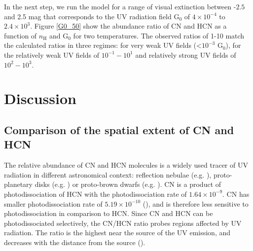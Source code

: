 \documentclass{aa}
\begin{document}
In the next step, we run the model for a
range of visual extinction between -$2.5$ and 2.5 mag that corresponds to
the UV radiation field G$_0$ of $4\times 10^{-4}$ to $2.4\times 10^{3}$. 
Figure \ref{G0_50} show the abundance ratio of CN and HCN as a function of
$n_\mathrm{H}$ and G$_0$ for two temperatures. The observed ratios 
of 1-10 match the calculated ratios in three regimes: for very weak UV fields (<$10^{-3}$ G$_0$),
for the relatively weak UV fields of $10^{-1}-10^1$ and relatively strong UV fields of $10^{2}-10^3$.

%
\section{Discussion}
\label{section:discussion}

\subsection{Comparison of the spatial extent of CN and HCN}
\label{subsection:extent}

The relative abundance of CN and HCN molecules is a widely used tracer of UV radiation in different
astronomical context: reflection nebulae (e.g. \citealt{Fue95}), proto-planetary disks (e.g.
\citealt{Cha12}) or proto-brown dwarfs (e.g. \citealt{Ria18}). CN is a product of photodissociation of
HCN with the photodissociation rate of $1.64\times10^{-9}$. CN has smaller photodissociation rate of
$5.19\times10^{-10}$ (\citealt{Hea17}), and is therefore less sensitive to photodissociation in comparison to HCN.
Since CN and HCN can be photodissociated selectively, the CN/HCN ratio probes regions
affected by UV radiation. The ratio is the highest near the source of the UV emission, and decreases
with the distance from the source (\citealt{Fue93}). 
\end{document}
